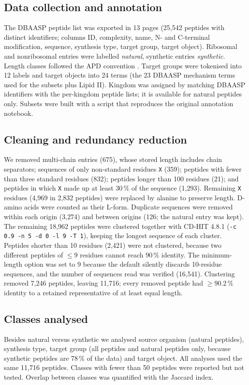\documentclass[11pt,a4paper]{article}
\begin{document}
\subsection{Data collection and annotation}
The DBAASP peptide list was exported in 13 pages (25{,}542 peptides with distinct identifiers; columns ID, complexity, name, N- and C-terminal modification, sequence, synthesis type, target group,
target object). Ribosomal and nonribosomal entries were labelled \emph{natural}, synthetic entries \emph{synthetic}. Length classes followed the APD convention \cite{wang2022}.
Target groups were tokenised into 12 labels and target objects into 24 terms (the 23 DBAASP mechanism terms used for the subsets plus Lipid II). Kingdom was assigned by matching DBAASP
identifiers with the per-kingdom peptide lists; it is available for natural peptides only. Subsets were built with a script that reproduces the original annotation notebook.

\subsection{Cleaning and redundancy reduction}
We removed multi-chain entries (675), whose stored length includes chain separators; sequences of only non-standard residues \texttt{X} (359); peptides with fewer than three standard residues (832);
peptides longer than 100 residues (21); and peptides in which \texttt{X} made up at least 30\,\% of the sequence (1{,}293). Remaining \texttt{X} residues (4{,}969 in 2{,}832 peptides) were replaced by alanine
to preserve length. D-amino acids were counted as their L-form. Duplicate sequences were removed within each origin (3{,}274) and between origins (126; the natural entry was kept).
The remaining 18{,}962 peptides were clustered together with CD-HIT 4.8.1 \cite{li2006,fu2012} (\texttt{-c 0.9 -n 5 -d 0 -l 9 -T 1}), keeping the longest sequence of each cluster.
Peptides shorter than 10 residues (2{,}421) were not clustered, because two different peptides of $\leq 9$ residues cannot reach 90\,\% identity. The minimum-length option was set to 9 because the default
silently discards 10-residue sequences, and the number of sequences read was verified (16{,}541). Clustering removed 7{,}246 peptides, leaving 11{,}716; every removed peptide had $\geq 90.2$\,\% identity to a
retained representative of at least equal length.

\subsection{Classes analysed}
Besides natural versus synthetic we analysed source organism (natural peptides), synthesis type, target group (all peptides and natural peptides only, because synthetic peptides are 78\,\% of the data)
and target object. All analyses used the same 11{,}716 peptides. Classes with fewer than 50 peptides were reported but not tested. Overlap between classes was quantified with the Jaccard index.
\end{document}
